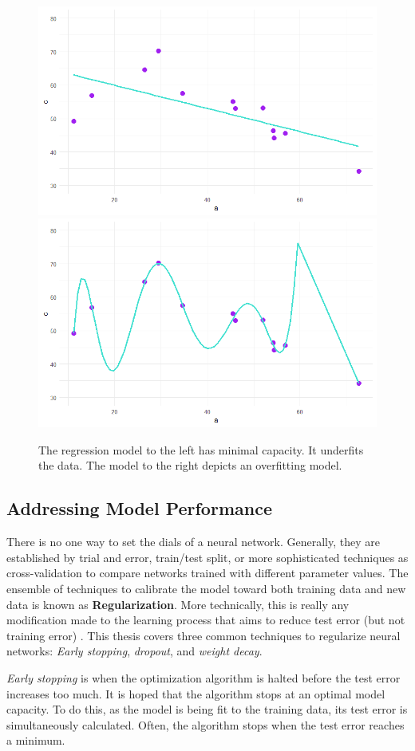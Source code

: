 
\begin{figure}[H]
    \includegraphics[width=0.5\linewidth]{Figures/underfit.png}
    \includegraphics[width=0.5\linewidth]{Figures/overfit.png}
    \vspace{-20pt}
    \caption{\footnotesize{The regression model to the left has minimal capacity.  It underfits the data. The model to the right depicts an overfitting model.}}
    \label{capacityviz}
\end{figure}


\subsection{Addressing Model Performance}

There is no one way to set the dials of a neural network.  Generally, they are established by trial and error, train/test split, or more sophisticated techniques as cross-validation to compare networks trained with different parameter values. \cite{mackay1992practical}  The ensemble of techniques to calibrate the model toward both training data and new data is known as \textbf{Regularization}.  More technically, this is really any modification made to the learning process that aims to reduce test error (but not training error) \cite{Goodfellow-et-al-2016}.  This thesis covers three common techniques to regularize neural networks: \textit{Early stopping}, \textit{dropout}, and \textit{weight decay}.

\textit{Early stopping} is when the optimization algorithm is halted before the test error increases too much.  It is hoped that the algorithm stops at an optimal model capacity. To do this, as the model is being fit to the training data, its test error is simultaneously calculated. 
 Often, the algorithm stops when the test error reaches a minimum. \cite{doan2004generalization}

